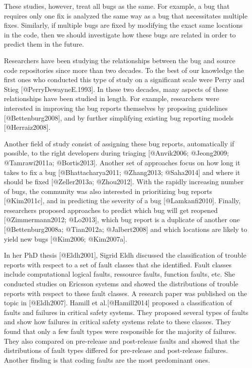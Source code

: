 These studies, however, treat all bugs as the same. For example, a bug
that requires only one fix is analyzed the same way as a bug that
necessitates multiple fixes. Similarly, if multiple bugs are fixed by
modifying the exact same locations in the code, then we should
investigate how these bugs are related in order to predict them in the
future.

Researchers have been studying the relationships between the bug and
source code repositories since more than two decades. To the best of our
knowledge the first ones who conducted this type of study on a
significant scale were Perry and Stieg {[}@PerryDewayneE.1993{]}. In
these two decades, many aspects of these relationships have been studied
in length. For example, researchers were interested in improving the bug
reports themselves by proposing guidelines {[}@Bettenburg2008{]}, and by
further simplifying existing bug reporting models {[}@Herraiz2008{]}.

Another field of study consist of assigning these bug reports,
automatically if possible, to the right developers during triaging
{[}@Anvik2006; @Jeong2009; @Tamrawi2011a; @Bortis2013{]}. Another set of
approaches focus on how long it takes to fix a bug {[}@Bhattacharya2011;
@Zhang2013; @Saha2014{]} and where it should be fixed {[}@Zeller2013a;
@Zhou2012{]}. With the rapidly increasing number of bugs, the community
was also interested in prioritizing bug reports {[}@Kim2011c{]}, and in
predicting the severity of a bug {[}@Lamkanfi2010{]}. Finally,
researchers proposed approaches to predict which bug will get reopened
{[}@Zimmermann2012; @Lo2013{]}, which bug report is a duplicate of
another one {[}@Bettenburg2008a; @Tian2012a; @Jalbert2008{]} and which
locations are likely to yield new bugs {[}@Kim2006; @Kim2007a{]}.

In her PhD thesis {[}@Eldh2001{]}, Sigrid Eldh discussed the
classification of trouble reports with respect to a set of fault classes
that she identified. Fault classes include computational logical faults,
ressource faults, function faults, etc. She conducted studies on
Ericsson systems and showed the distributions of trouble reports with
respect to these fault classes. A research paper was published on the
topic in {[}@Eldh2007{]}. Hamill et al.{[}@Hamill2014{]} proposed a
classification of faults and failures in critical safety systems. They
proposed several types of faults and show how failures in critical
safety systems relate to these classes. They found that only a few fault
types were responsible for the majority of failures. They also compared
on pre-release and post-release faults and showed that the distributions
of fault types differed for pre-release and post-release failures.
Another finding is that coding faults are the most predominant ones.

